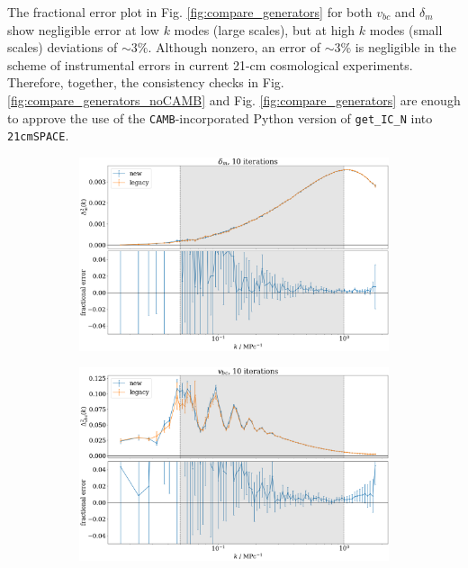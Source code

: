 \documentclass[floats,floatfix,showpacs,amssymb,prd,superscriptaddress,nofootinbib, 11pt]{revtex4-2} %
\newcommand{\code}{\texttt}
\newcommand{\red}{\textcolor{red}}
\begin{document}
The fractional error plot in Fig. \ref{fig:compare_generators} for both $v_{bc}$ and $\delta_m$ show negligible error at low $k$ modes (large scales), but at high $k$ modes (small scales) deviations of $\sim 3 \%$.
Although nonzero, an error of $\sim 3 \%$ is negligible in the scheme of instrumental errors in current 21-cm cosmological experiments. Therefore, together, the consistency checks in Fig. \ref{fig:compare_generators_noCAMB} and Fig. \ref{fig:compare_generators} are enough to approve the use of the \code{CAMB}-incorporated Python version of \code{get\_IC\_N} into \code{21cmSPACE}.

\newpage
\begin{figure}[H]
     \centering
     \begin{subfigure}[b]{0.8\textwidth}
         \centering
         \includegraphics[width=\textwidth]{images/ic_power_spectra/compare_generators_averaged_power_spectra_with_residual_noCAMB_delta_m.png}
         \label{fig:compare_generators_power_spectrum_noCAMB_delta_m}
     \end{subfigure}
     \hfill
     \begin{subfigure}[b]{0.8\textwidth}
         \centering
         \includegraphics[width=\textwidth]{images/ic_power_spectra/compare_generators_averaged_power_spectra_with_residual_noCAMB_v_bc.png}

\end{subfigure}
\end{figure}
\end{document}
